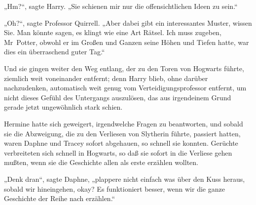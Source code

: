„Hm?“, sagte Harry. „Sie schienen mir nur die offensichtlichen Ideen zu sein.“

„Oh?“, sagte Professor Quirrell. „Aber dabei gibt ein interessantes Muster, wissen Sie. Man könnte sagen, es klingt wie eine Art Rätsel. Ich muss zugeben, Mr~Potter, obwohl er im Großen und Ganzen seine Höhen und Tiefen hatte, war dies ein überraschend guter Tag.“

Und sie gingen weiter den Weg entlang, der zu den Toren von Hogwarts führte, ziemlich weit voneinander entfernt; denn Harry blieb, ohne darüber nachzudenken, automatisch weit genug vom Verteidigungsprofessor entfernt, um nicht dieses Gefühl des Untergangs auszulösen, das aus irgendeinem Grund gerade jetzt ungewöhnlich stark schien.


Hermine hatte sich geweigert, irgendwelche Fragen zu beantworten, und sobald sie die Abzweigung, die zu den Verliesen von Slytherin führte, passiert hatten, waren Daphne und Tracey sofort abgehauen, so schnell sie konnten. Gerüchte verbreiteten sich schnell in Hogwarts, so daß sie sofort in die Verliese gehen mußten, wenn sie die Geschichte allen als erste erzählen wollten.

„Denk dran“, sagte Daphne, „plappere nicht einfach was über den Kuss heraus, sobald wir hineingehen, okay? Es funktioniert besser, wenn wir die ganze Geschichte der Reihe nach erzählen.“

